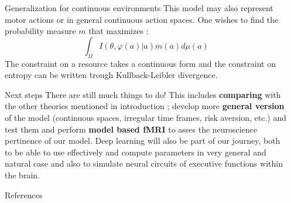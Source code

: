 \documentclass[final]{beamer}
\newlength{\sepwidth}
\newlength{\colwidth}
\newcommand{\separatorcolumn}{\begin{column}{\sepwidth}\end{column}}
\begin{document}
\begin{frame}[t]
\begin{columns}[t]
\begin{column}{\colwidth}
    \begin{block}{Generalization for continuous environments}
This model may also represent motor actions or in general continuous action spaces. One wishes to find the probability measure $m$ that maximizes :
$$\int_{ \Omega} I \left( \theta , \varphi (a) | a \right) m(a) d \mu (a) $$
The constraint on a resource takes a continuous form and the constraint on entropy can be written trough Kullback-Leibler divergence.
  \end{block}
 
  \begin{block}{Next steps}
There are  still much things to do!  This includes \textbf{comparing} with the other theories mentioned in introduction ; develop more \textbf{general version} of the model (continuous spaces, irregular time frames, risk aversion, etc.) and test them and perform \textbf{model based fMRI} to asses the neuroscience pertinence of our model. 
Deep learning will also be part of our journey, both to be able to use effectively and compute parameters in very general and natural case and also to  simulate neural circuits of executive functions within the brain.
  \end{block}
  \begin{block}{References}
 \footnotesize{\printbibliography}
 
  \end{block}
\end{column}
\separatorcolumn
\end{columns}
\end{frame}
\end{document}
